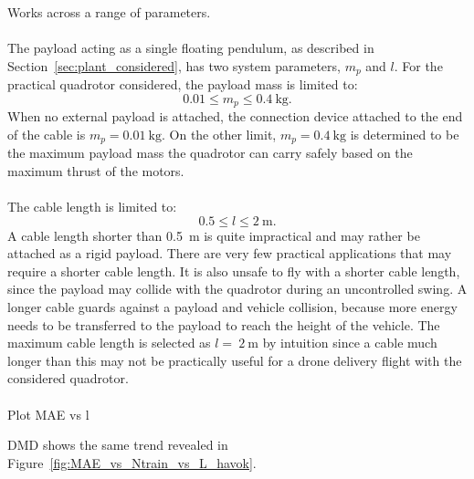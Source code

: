         Works across a range of parameters.

        \paragraph{}
        The payload acting as a single floating pendulum, as described in Section~\ref{sec:plant_considered},
        has two system parameters, $m_p$ and $l$.
        For the practical quadrotor considered, the payload mass is limited to:
        \begin{equation}
            0.01 \leq m_p \leq \SI{0.4}{\kilo\gram} .
        \end{equation}
        When no external payload is attached, the connection device attached to the end of the cable is 
        $m_p = \SI{0.01}{\kilo\gram}$.
        On the other limit, $m_p = \SI{0.4}{\kilo\gram}$ is determined to be the maximum payload mass the quadrotor can carry safely 
        based on the maximum thrust of the motors.

        \paragraph{}
        The cable length is limited to:
        \begin{equation}
            0.5 \leq l \leq \SI{2}{\metre} .
        \end{equation}
        A cable length shorter than \SI{0.5}{\metre} is quite impractical and may rather be attached as a rigid payload.
        There are very few practical applications that may require a shorter cable length.
        It is also unsafe to fly with a shorter cable length, 
        since the payload may collide with the quadrotor during an uncontrolled swing.
        A longer cable guards against a payload and vehicle collision, 
        because more energy needs to be transferred to the payload to reach the height of the vehicle. 
        The maximum cable length is selected as $l=~\SI{2}{\metre}$ by intuition 
        since a cable much longer than this may not be practically useful for a drone delivery flight with the considered quadrotor.

        \paragraph{}
        Plot MAE vs l
        
        DMD shows the same trend revealed in Figure~\ref{fig:MAE_vs_Ntrain_vs_L_havok}.

